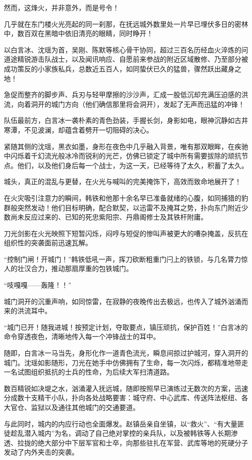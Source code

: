 然而，这烽火，并非意外，而是号令！

几乎就在东门楼火光亮起的同一刹那，在抚远城外数里处一片早已埋伏多日的密林中，数百双在黑暗中依旧清亮的眼睛，同时睁开！

以白言冰、沈瑶为首，吴刚、陈默等核心骨干协同，超过三百名历经血火淬炼的问道途精锐游击队战士，以及闻讯响应、自愿前来参战的附近区域散修、乃至部分被成功策反的小家族私兵，总数近五百人，如同蛰伏已久的猛兽，骤然跃出藏身之地！

急促而整齐的脚步声、兵刃与轻甲摩擦的沙沙声，汇成一股低沉却充满压迫感的洪流，向着洞开的城门方向（他们确信那里将会洞开），发起了无声而迅猛的冲锋！

队伍最前方，白言冰一袭朴素的青色劲装，手握长剑，身影如电，眼神沉静如古井寒潭，不见波澜，却蕴含着劈开一切阻碍的决心。

紧随其侧的沈瑶，黑衣如墨，身形在夜色中几乎融入背景，唯有那双眼眸，在疾驰中闪烁着千幻流光般冰冷而锐利的光芒，仿佛已锁定了城中所有需要拔除的顽抗节点。他们，以及他们身后每一个战士，为这一天，已经等待了太久，积蓄了太久。

城头，真正的混乱与更替，在火光与喊叫的完美掩饰下，高效而致命地展开了！

在火灾吸引注意力的瞬间，韩铁和他那十余名早已准备就绪的心腹，如同捕猎的豹群般突然发动！他们目标明确，配合默契，以迅雷不及掩耳之势，扑向东门附近少数尚未反应过来的、已知的死忠紫阳宗、丹鼎阁修士及其铁杆附庸。

刀光剑影在火光映照下短暂闪烁，闷哼与短促的惨叫声被更大的嘈杂掩盖，反抗在组织性的突袭面前迅速瓦解。

“控制门闸！开城门！”韩铁低吼一声，挥刀砍断粗重门闩上的铁锁，与几名膂力惊人的壮汉合力，推动那扇厚重的包铁城门。

“吱嘎嘎——轰隆！！”

城门洞开的沉重声响，如同惊雷，在寂静的夜晚传出去极远，也传入了城外汹涌而来的洪流耳中。

“城门已开！随我进城！按预定计划，夺取要点，镇压顽抗，保护百姓！”白言冰的命令穿透夜色，清晰地传入每一个冲锋战士的耳中。

随即，白言冰一马当先，身形化作一道青色流光，瞬息间掠过护城河，穿入洞开的城门。沈瑶如影随形，刀光在她手中仿佛拥有了生命，每一次闪烁，都精准地带走一名试图组织抵抗的士兵的性命，为后续大军扫清道路。

数百精锐如决堤之水，汹涌灌入抚远城，随即按照早已演练过无数次的方案，迅速分成数十支精干小队，扑向各处战略要害：城守府、中心武库、传送阵法枢纽、各大官仓、监狱以及通往其他城门的交通要道。

与此同时，城内的内应行动也全面爆发。赵镇岳亲自坐镇，以“救火”、“有大量匪徒趁乱潜入城内”为名，调动了自己绝对掌控的亲兵队，以及被韩铁等人长期渗透、拉拢的绝大部分中下层军官和士卒，向那些驻扎在军营、武库等地的死硬分子发动了内外夹击的突袭。

